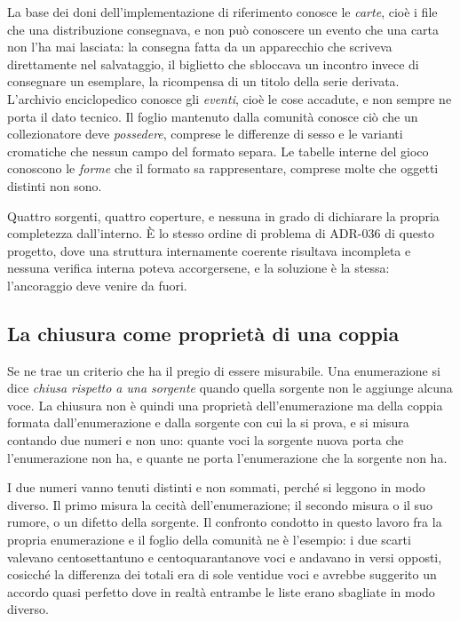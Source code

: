 La base dei doni dell'implementazione di riferimento conosce le \emph{carte}, cioè i file che una distribuzione consegnava, e non può conoscere un evento che una carta non l'ha mai lasciata: la consegna fatta da un apparecchio che scriveva direttamente nel salvataggio, il biglietto che sbloccava un incontro invece di consegnare un esemplare, la ricompensa di un titolo della serie derivata. L'archivio enciclopedico conosce gli \emph{eventi}, cioè le cose accadute, e non sempre ne porta il dato tecnico. Il foglio mantenuto dalla comunità conosce ciò che un collezionatore deve \emph{possedere}, comprese le differenze di sesso e le varianti cromatiche che nessun campo del formato separa. Le tabelle interne del gioco conoscono le \emph{forme} che il formato sa rappresentare, comprese molte che oggetti distinti non sono.

Quattro sorgenti, quattro coperture, e nessuna in grado di dichiarare la propria completezza dall'interno. È lo stesso ordine di problema di ADR-036 di questo progetto, dove una struttura internamente coerente risultava incompleta e nessuna verifica interna poteva accorgersene, e la soluzione è la stessa: l'ancoraggio deve venire da fuori.

\subsection{La chiusura come proprietà di una coppia}

Se ne trae un criterio che ha il pregio di essere misurabile. Una enumerazione si dice \emph{chiusa rispetto a una sorgente} quando quella sorgente non le aggiunge alcuna voce. La chiusura non è quindi una proprietà dell'enumerazione ma della coppia formata dall'enumerazione e dalla sorgente con cui la si prova, e si misura contando due numeri e non uno: quante voci la sorgente nuova porta che l'enumerazione non ha, e quante ne porta l'enumerazione che la sorgente non ha.

I due numeri vanno tenuti distinti e non sommati, perché si leggono in modo diverso. Il primo misura la cecità dell'enumerazione; il secondo misura o il suo rumore, o un difetto della sorgente. Il confronto condotto in questo lavoro fra la propria enumerazione e il foglio della comunità ne è l'esempio: i due scarti valevano centosettantuno e centoquarantanove voci e andavano in versi opposti, cosicché la differenza dei totali era di sole ventidue voci e avrebbe suggerito un accordo quasi perfetto dove in realtà entrambe le liste erano sbagliate in modo diverso.

